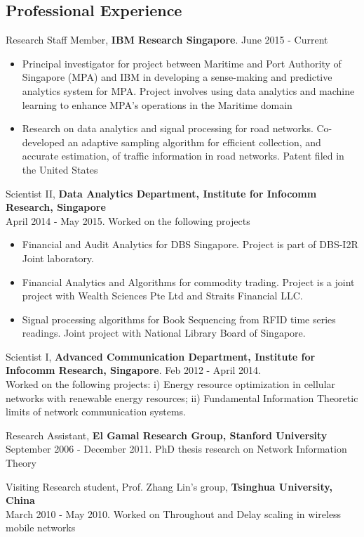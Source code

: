 \documentclass[margin]{res}
\begin{document}
\begin{resume}
\section{Professional Experience}
Research Staff Member, \textbf{IBM Research Singapore}. June 2015 - Current
\begin{itemize}
\item Principal investigator for project between Maritime and Port Authority of Singapore (MPA) and IBM in developing a sense-making and predictive analytics system for MPA. Project involves using data analytics and machine learning to enhance MPA's operations in the Maritime domain
\item Research on data analytics and signal processing for road networks. Co-developed an adaptive sampling algorithm for efficient collection, and accurate estimation, of traffic information in road networks. Patent filed in the United States 
\end{itemize}
Scientist II, \textbf{Data Analytics Department, Institute for Infocomm Research, Singapore} \\
April 2014 - May 2015. Worked on the following projects
\begin{itemize}
\item Financial and Audit Analytics for DBS Singapore. Project is part of DBS-I2R Joint laboratory.
\item Financial Analytics and Algorithms for commodity trading. Project is a joint project with Wealth Sciences Pte Ltd and Straits Financial LLC.
\item Signal processing algorithms for Book Sequencing from RFID time series readings. Joint project with National Library Board of Singapore.
\end{itemize}

Scientist I, \textbf{Advanced Communication Department, Institute for Infocomm Research, Singapore}. Feb 2012 - April 2014. \\
Worked on the following projects: i) Energy resource optimization in cellular networks with renewable energy resources; ii) Fundamental Information Theoretic limits of network communication systems.

Research Assistant, \textbf{El Gamal Research Group, Stanford University}\\
September 2006 - December 2011. PhD thesis research on Network Information Theory

Visiting Research student, Prof. Zhang Lin's group, \textbf{Tsinghua University, China}\\
March 2010 - May 2010. Worked on Throughout and Delay scaling in wireless mobile networks


\end{resume}
\end{document}
